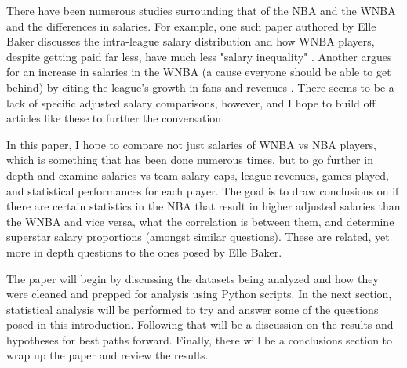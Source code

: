 \documentclass[12pt]{article}
\begin{document}
\par
There have been numerous studies surrounding that of the NBA and the WNBA and the differences in salaries.
For example, one such paper authored by Elle Baker discusses the intra-league salary distribution and
how WNBA players, despite getting paid far less, have much less "salary inequality"
\cite{baker2020comparison}. Another argues for an increase in salaries in the WNBA (a cause everyone
should be able to get behind) by citing the league's growth in fans and revenues \cite{ettienne2019s}.
There seems to be a lack of specific adjusted salary comparisons, however, and I hope to build off articles
like these to further the conversation.
\par
In this paper, I hope to compare not just salaries of WNBA vs NBA players, which is something that has been done numerous times, but to go further in depth and examine salaries vs team salary caps, league revenues, games played, and statistical performances for each player. The goal is to draw conclusions on if there are certain statistics in the NBA that result in higher adjusted salaries than the WNBA and vice versa, what the correlation is between them, and determine superstar salary proportions (amongst similar questions). These are related, yet more in depth questions to the ones posed by Elle Baker.
\par
The paper will begin by discussing the datasets being analyzed and how they were cleaned and prepped for analysis using Python scripts. In the next section, statistical analysis will be performed to try and answer some of the questions posed in this introduction. Following that will be a discussion on the results and hypotheses for best paths forward. Finally, there will be a conclusions section to wrap up the paper and review the results.
\end{document}
